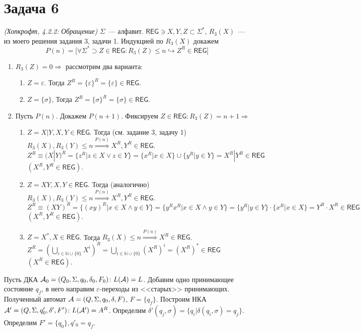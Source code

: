 \documentclass[a4paper]{article}
\def\A{{\cal A}}
\def\REG{{\mathsf{REG}}}
\begin{document}
\section*{Задача 6}
{\em{(Хопкрофт, 4.2.2: Обращение)}}\newline
$\Sigma$~--- алфавит. $\REG\ni X,Y,Z\subset\Sigma^*$, $R_3(X)$~--- из моего решения задания 3, задачи 1. Индукцией по $R_3(X)$ докажем
$$P(n)=\big[\forall \Sigma^*\supset Z\in\REG\colon R_3(Z)\leqslant n\hookrightarrow Z^R\in\REG\big]$$
\begin{enumerate}
\item $R_3(Z)=0\Rightarrow$ рассмотрим два варианта:\begin{enumerate}
\item $Z={\varepsilon}$. Тогда $Z^R=\{\varepsilon\}^R=\{\varepsilon\}\in\REG$.
\item $Z=\{\sigma\}$, Тогда $Z^R=\{\sigma\}^R=\{\sigma\}\in\REG$.
\end{enumerate}
\item Пусть $P(n)$. Докажем $P(n+1)$. Фиксируем $Z\in\REG\colon R_3(Z)=n+1\Rightarrow$
\begin{enumerate}
\item $Z=X|Y,X,Y\in\REG$. Тогда (см. задание 3, задачу 1) $R_3(X),R_3(Y)\leqslant n\overset{P(n)}{\Rightarrow}X^R,Y^R\in\REG$. $Z^R\equiv(X|Y)^R=\{z^R\big|z\in X\vee z\in Y\}=\{x^R\big|x\in X\}\cup\{y^R\big|y\in Y\}=X^R|Y^R\in\REG$ $(X^R,Y^R\in\REG)$.
\item $Z=XY,X,Y\in\REG$. Тогда (аналогично) $R_3(X),R_3(Y)\leqslant n\overset{P(n)}{\Rightarrow}X^R,Y^R\in\REG$. $Z^R\equiv(XY)^R=\{(xy)^R\big|x\in X\wedge y\in Y\}=\{y^Rx^R\big|x\in X\wedge y\in Y\}=\{y^R\big|y\in Y\}\cdot \{x^R\big|x\in X\}=Y^R\cdot X^R\in\REG$ $(X^R,Y^R\in\REG)$.
\item $Z=X^*,X\in\REG$. Тогда $R_3(X)\leqslant n\overset{P(n)}{\Rightarrow}X^R\in\REG$. $Z^R=\left(\bigcup\limits_{i\in {\mathbb N}\cup \{0\}}X^i\right)^R=\bigcup\limits_{i\in {\mathbb N}\cup \{0\}}(X^R)^i=(X^R)^*\in\REG$ $(X^R\in\REG)$.
\end{enumerate}
\end{enumerate}
$\,$
\\[10pt]
Пусть ДКА $\A_0=(Q_0,\Sigma,q_0,\delta_0,F_0)\colon L(\A)=L$. Добавим одно принимающее состояние $q_f$, в него направим $\varepsilon$-переходы из <<старых>> принимающих. Полученный автомат $\A=(Q,\Sigma,q_0,\delta,F)$, $F=\{q_f\}$. Построим НКА $\A'=(Q,\Sigma,q'_0,\delta',F')\colon L(\A')=A^R$.\newline
Определим $\delta'(q_j,\sigma)=\{q_i\big|\delta(q_i,\sigma)=q_j\}$. Определим $F'=\{q_0\},q'_0=q_f$.\newline
\end{document}
